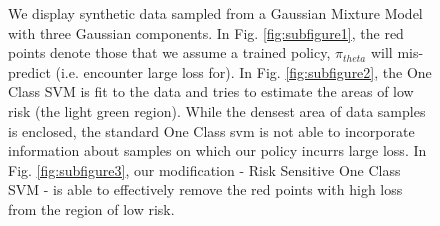 \documentclass[10pt, conference]{ieeeconf}      %
\begin{document}
\begin{figure}[ht]
\centering
{}
\quad
{}

\caption{We display synthetic data sampled from a Gaussian Mixture Model with three Gaussian components. In Fig.
\ref{fig:subfigure1}, the red points denote those that we assume a trained policy, $\pi_{theta}$ will mis-predict (i.e.
encounter large loss for). In Fig. \ref{fig:subfigure2}, the One Class SVM is fit to the data and tries to estimate the
areas of low risk (the light green region). While the densest area of data samples is enclosed, the standard One Class
svm is not able to incorporate information about samples on which our policy incurrs large loss. In Fig.
\ref{fig:subfigure3}, our modification - Risk Sensitive One Class SVM - is able to effectively remove the red points
with high loss from the region of low risk.}
\label{fig:support_example}
\end{figure}
\end{document}
